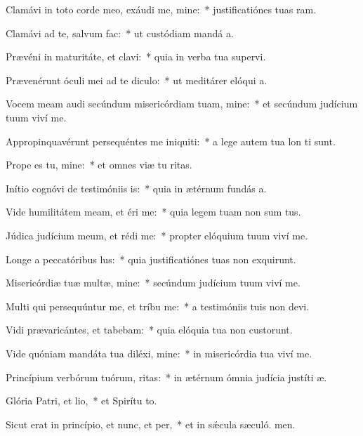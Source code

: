 \item Clamávi in toto corde meo, exáudi me, mine:~* justificatiónes tuas ram.
\item Clamávi ad te, salvum  fac:~* ut custódiam mandá a.
\item Prævéni in maturitáte, et clavi:~* quia in verba tua supervi.
\item Prævenérunt óculi mei ad te diculo:~* ut meditárer elóqui a.
\item Vocem meam audi secúndum misericórdiam tuam, mine:~* et secúndum judícium tuum viví me.
\item Appropinquavérunt persequéntes me iniquiti:~* a lege autem tua lon ti sunt.
\item Prope es tu, mine:~* et omnes viæ tu ritas.
\item Inítio cognóvi de testimóniis is:~* quia in ætérnum fundás a.
\item Vide humilitátem meam, et éri me:~* quia legem tuam non sum tus.
\item Júdica judícium meum, et rédi me:~* propter elóquium tuum viví me.
\item Longe a peccatóribus lus:~* quia justificatiónes tuas non exquirunt.
\item Misericórdiæ tuæ multæ, mine:~* secúndum judícium tuum viví me.
\item Multi qui persequúntur me, et tríbu me:~* a testimóniis tuis non devi.
\item Vidi prævaricántes, et tabebam:~* quia elóquia tua non custorunt.
\item Vide quóniam mandáta tua diléxi, mine:~* in misericórdia tua viví me.
\item Princípium verbórum tuórum, ritas:~* in ætérnum ómnia judícia justíti æ.
\item Glória Patri, et lio,~* et Spirítu to.
\item Sicut erat in princípio, et nunc, et per,~* et in sǽcula sæculó. men.
